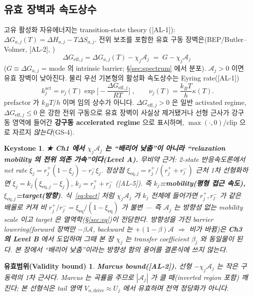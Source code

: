 \documentclass[11pt,a4paper]{article}
\newtheorem*{boundbox}{유효범위(Validity bound)}
\newtheorem*{keybox}{Keystone}
\newcommand{\eff}{\mathrm{eff}}
\newcommand{\eq}{\mathrm{eq}}
\newcommand{\drive}{\mathrm{drive}}
\newcommand{\AL}[1]{\textsf{[AL-#1]}}
\begin{document}
\subsection{유효 장벽과 속도상수}
고유 활성화 자유에너지는 transition-state theory \cite{eyring1935,evanspolanyi1938}(\AL{1}):
$\Delta G_{a,j}(T)=\Delta H_{a,j}-T\Delta S_{a,j}$. 전위 보조를 포함한 유효 구동 장벽은(BEP/Butler--Volmer,
\AL{2}, \cite{evanspolanyi1938,bardfaulkner})
\begin{equation}
\boxed{\;\Delta G_{\eff,j}=\Delta G_{a,j}(T)-\chi_j\mathcal A_j\;=\;G-\chi_j\mathcal A_j\;}
\label{eq:Geff}
\end{equation}
($G\equiv\Delta G_{a,j}$ = mode 의 intrinsic barrier; \S\ref{sec:spectrum} 에서 분포). $\mathcal A_j>0$
이면 유효 장벽이 낮아진다. 물리 우선 기본형의 활성화 속도상수는 Eyring rate(\AL{1})
\begin{equation}
\boxed{\;k_j^\mathrm{act}=\nu_j(T)\exp\!\Big[-\frac{\Delta G_{\eff,j}}{RT}\Big]\;},\qquad
\nu_j(T)=\frac{k_BT}{h}\kappa(T).
\label{eq:kact}
\end{equation}
prefactor 가 $k_BT/h$ 이며 임의 상수가 아니다. $\Delta G_{\eff,j}>0$ 은 일반 activated regime,
$\Delta G_{\eff,j}\le0$ 은 강한 전위 구동으로 유효 장벽이 사실상 제거됐거나 선형 근사가 강구동 영역에
들어간 \textbf{강구동 accelerated regime} 으로 표시하며, $\max(\cdot,0)$/clip 으로 자르지 \emph{않는다}(GS-4).

\begin{keybox}
\textbf{★ Ch1 에서 $\chi_j\mathcal A_j$ 는 ``배리어 낮춤''이 아니라 ``relaxation mobility 의 전위 의존
\emph{가속}''이다(Level A).} 무비약 근거: 2-state 반응속도론에서 net rate
$\dot\xi_j=r_j^+(1-\xi_j)-r_j^-\xi_j$. 정상점 $\xi_{\eq,j}=r_j^+/(r_j^++r_j^-)$ 근처 1차 선형화하면
$\dot\xi_j=k_j(\xi_{\eq,j}-\xi_j)$, $k_j=r_j^++r_j^-$ (\AL{5}). 즉 \textbf{$k_j$=mobility(평형 접근
속도), $\xi_{\eq,j}$=target(방향)}. 식~\eqref{eq:kact} 처럼 $\chi_j\mathcal A_j$ 가 \emph{$k_j$ 전체}에
들어가면 $r_j^+,r_j^-$ 가 같은 배율로 커져 비 $r_j^+/r_j^-=\xi_\eq/(1-\xi_\eq)$ 가 \emph{불변} — 즉
$\mathcal A_j$ 는 방향성 없는 mobility scale 이고 target 은 열역학(\S\ref{sec:eq})이 전담한다. \emph{방향성을
가진} barrier lowering(forward 장벽만 $-\beta\mathcal A$, backward 는 $+(1-\beta)\mathcal A$ $\Rightarrow$
비가 바뀜)은 \textbf{Ch3 의 Level B} 에서 도입하며 그때 본 장 $\chi_j$ 는 transfer coefficient $\beta_j$
와 동일물이 된다. 본 장에서 ``배리어 낮춤''이라는 방향성 함의 용어를 결론식에 쓰지 않는다.
\end{keybox}
\begin{boundbox}
\textbf{Marcus bound(\AL{2}).} 선형 $-\chi_j\mathcal A_j$ 는 작은 구동력의 1차 근사다. Marcus
\cite{marcus1956} 는 곡률을 주므로 $|\mathcal A_j|$ 가 클 때(inverted region 포함) 깨진다; 본 선형식은
tail 영역 $V_{n,\drive}\approx U_j$ 에서 유효하며 전역 정당화가 아니다.
\end{boundbox}
\end{document}
